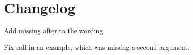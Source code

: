 \section{Changelog}
\begin{revision}
\item Add missing  after  to the wording.
\item Fix  call in an example, which was missing a second argument.
\end{revision}
